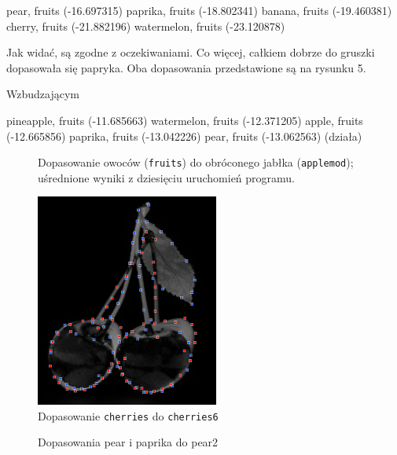 \documentclass[a4paper,12pt,leqno]{article}
\begin{document}
pear, fruits (-16.697315)
paprika, fruits (-18.802341)
banana, fruits (-19.460381)
cherry, fruits (-21.882196)
watermelon, fruits (-23.120878)

Jak widać, są zgodne z oczekiwaniami. Co więcej, całkiem dobrze do gruszki dopasowała się papryka. Oba dopasowania przedstawione są na rysunku 5.


Wzbudzającym 

pineapple, fruits (-11.685663)
watermelon, fruits (-12.371205)
apple, fruits (-12.665856)
paprika, fruits (-13.042226)
pear, fruits (-13.062563) (działa)


\begin{figure}\centering
\footnotesize\vspace{-2em}
\normalsize\caption{Dopasowanie owoców (\texttt{fruits}) do obróconego jabłka (\texttt{applemod}); uśrednione wyniki z dziesięciu uruchomień programu.}
\end{figure} 

\begin{figure}\centering
\includegraphics[width=6cm,keepaspectratio=true]{./cherries-match.png}
\caption{Dopasowanie \texttt{cherries} do \texttt{cherries6}}
\end{figure}

\begin{figure}\centering
{}
\caption{Dopasowania pear i paprika do pear2}
\end{figure}
\end{document}
